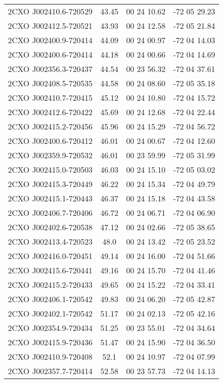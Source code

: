 \begin{table}
\begin{tabular}{cccc}
2CXO J002410.6-720529 & 43.45 & 00 24 10.62 & -72 05 29.23 \\
2CXO J002412.5-720521 & 43.93 & 00 24 12.58 & -72 05 21.84 \\
2CXO J002400.9-720414 & 44.09 & 00 24 00.97 & -72 04 14.03 \\
2CXO J002400.6-720414 & 44.18 & 00 24 00.66 & -72 04 14.69 \\
2CXO J002356.3-720437 & 44.54 & 00 23 56.32 & -72 04 37.61 \\
2CXO J002408.5-720535 & 44.58 & 00 24 08.60 & -72 05 35.18 \\
2CXO J002410.7-720415 & 45.12 & 00 24 10.80 & -72 04 15.72 \\
2CXO J002412.6-720422 & 45.69 & 00 24 12.68 & -72 04 22.44 \\
2CXO J002415.2-720456 & 45.96 & 00 24 15.29 & -72 04 56.72 \\
2CXO J002400.6-720412 & 46.01 & 00 24 00.67 & -72 04 12.60 \\
2CXO J002359.9-720532 & 46.01 & 00 23 59.99 & -72 05 31.99 \\
2CXO J002415.0-720503 & 46.03 & 00 24 15.10 & -72 05 03.02 \\
2CXO J002415.3-720449 & 46.22 & 00 24 15.34 & -72 04 49.79 \\
2CXO J002415.1-720443 & 46.37 & 00 24 15.18 & -72 04 43.58 \\
2CXO J002406.7-720406 & 46.72 & 00 24 06.71 & -72 04 06.90 \\
2CXO J002402.6-720538 & 47.12 & 00 24 02.66 & -72 05 38.65 \\
2CXO J002413.4-720523 & 48.0 & 00 24 13.42 & -72 05 23.52 \\
2CXO J002416.0-720451 & 49.14 & 00 24 16.00 & -72 04 51.66 \\
2CXO J002415.6-720441 & 49.16 & 00 24 15.70 & -72 04 41.46 \\
2CXO J002415.2-720433 & 49.65 & 00 24 15.22 & -72 04 33.41 \\
2CXO J002406.1-720542 & 49.83 & 00 24 06.20 & -72 05 42.87 \\
2CXO J002402.1-720542 & 51.17 & 00 24 02.13 & -72 05 42.16 \\
2CXO J002354.9-720434 & 51.25 & 00 23 55.01 & -72 04 34.64 \\
2CXO J002415.9-720436 & 51.47 & 00 24 15.90 & -72 04 36.50 \\
2CXO J002410.9-720408 & 52.1 & 00 24 10.97 & -72 04 07.99 \\
2CXO J002357.7-720414 & 52.58 & 00 23 57.73 & -72 04 14.13 \\

\end{tabular}
\end{table}
